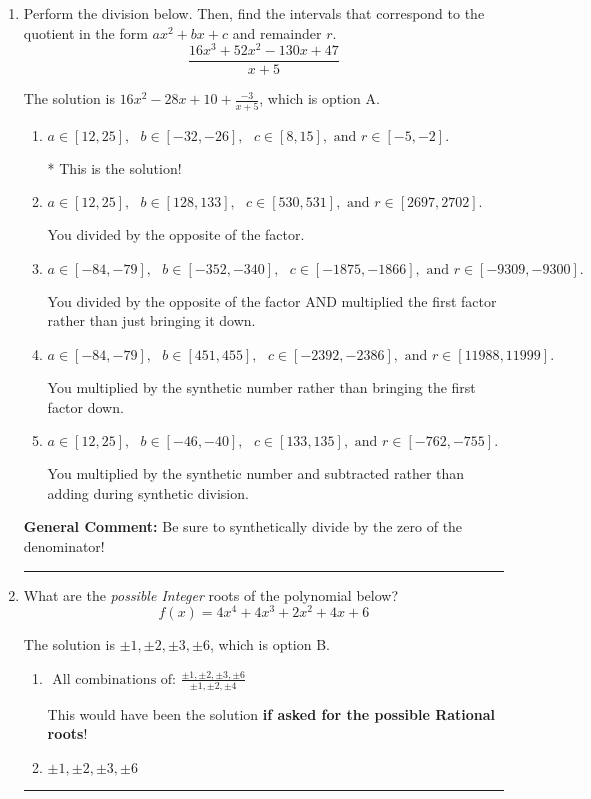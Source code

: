 \documentclass{extbook}[14pt]
\newcommand{\litem}[1]{\item #1

\rule{\textwidth}{0.4pt}}
\begin{document}
\begin{enumerate}\litem{
Perform the division below. Then, find the intervals that correspond to the quotient in the form $ax^2+bx+c$ and remainder $r$.
\[ \frac{16x^{3} +52 x^{2} -130 x + 47}{x + 5} \]

The solution is \( 16x^{2} -28 x + 10 + \frac{-3}{x + 5} \), which is option A.\begin{enumerate}[label=\Alph*.]
\item \( a \in [12, 25], \text{   } b \in [-32, -26], \text{   } c \in [8, 15], \text{   and   } r \in [-5, -2]. \)

* This is the solution!
\item \( a \in [12, 25], \text{   } b \in [128, 133], \text{   } c \in [530, 531], \text{   and   } r \in [2697, 2702]. \)

 You divided by the opposite of the factor.
\item \( a \in [-84, -79], \text{   } b \in [-352, -340], \text{   } c \in [-1875, -1866], \text{   and   } r \in [-9309, -9300]. \)

 You divided by the opposite of the factor AND multiplied the first factor rather than just bringing it down.
\item \( a \in [-84, -79], \text{   } b \in [451, 455], \text{   } c \in [-2392, -2386], \text{   and   } r \in [11988, 11999]. \)

 You multiplied by the synthetic number rather than bringing the first factor down.
\item \( a \in [12, 25], \text{   } b \in [-46, -40], \text{   } c \in [133, 135], \text{   and   } r \in [-762, -755]. \)

 You multiplied by the synthetic number and subtracted rather than adding during synthetic division.
\end{enumerate}

\textbf{General Comment:} Be sure to synthetically divide by the zero of the denominator!
}
\litem{
What are the \textit{possible Integer} roots of the polynomial below?
\[ f(x) = 4x^{4} +4 x^{3} +2 x^{2} +4 x + 6 \]

The solution is \( \pm 1,\pm 2,\pm 3,\pm 6 \), which is option B.\begin{enumerate}[label=\Alph*.]
\item \( \text{ All combinations of: }\frac{\pm 1,\pm 2,\pm 3,\pm 6}{\pm 1,\pm 2,\pm 4} \)

This would have been the solution \textbf{if asked for the possible Rational roots}!
\item \( \pm 1,\pm 2,\pm 3,\pm 6 \)


\end{enumerate}}
\end{enumerate}
\end{document}
